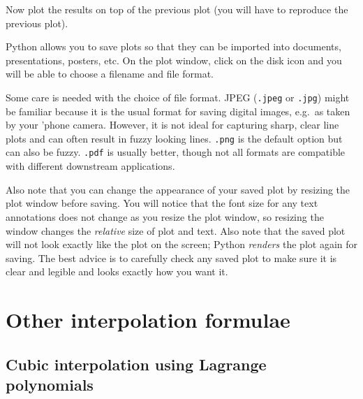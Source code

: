 


\vspace{5mm}

\noindent
Now plot the results on top of the previous plot (you will have to
reproduce the previous plot).


Python allows you to save plots so that they can be imported into
documents, presentations, posters, etc. On the plot window, click on
the disk icon and you will be able to choose a filename and file
format.

Some care is needed with the choice of file format. JPEG (\texttt{.jpeg} or \texttt{.jpg})
might be familiar because it is the usual format for saving digital images, e.g.\ as taken
by your 'phone camera.
However, it is not ideal for capturing sharp, clear line plots and can often result in
fuzzy looking lines. \texttt{.png} is the default option but can also be fuzzy. \texttt{.pdf} is usually better,
though not all formats are compatible with different downstream applications.

Also note that you can change the appearance of your saved plot by resizing the plot window
before saving. You will notice that the font size for any text annotations does not change
as you resize the plot window, so resizing the window changes the \textit{relative} size of
plot and text. Also note that the saved plot will not look exactly like the plot on the screen;
Python \textit{renders} the plot again for saving. The best advice is to carefully check any saved plot to make sure it is clear and legible
and looks exactly how you want it.


\section{Other interpolation formulae}

\subsection{Cubic interpolation using Lagrange polynomials} 

